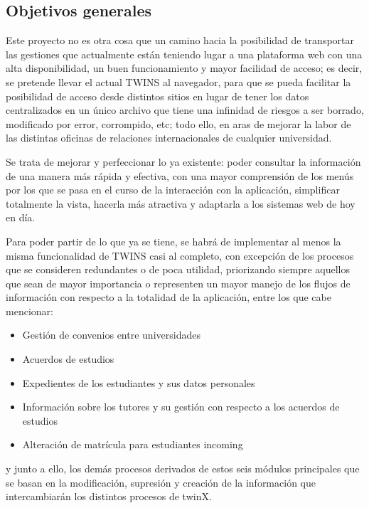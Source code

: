 \documentclass[12pt]{article}
\begin{document}
\subsection{Objetivos generales}

Este proyecto no es otra cosa que un camino hacia la posibilidad de transportar las gestiones que actualmente están teniendo lugar a una plataforma web con una alta disponibilidad, un buen funcionamiento y mayor facilidad de acceso; es decir, se pretende llevar el actual TWINS al navegador, para que se pueda facilitar la posibilidad de acceso desde distintos sitios en lugar de tener los datos centralizados en un único archivo que tiene una infinidad de riesgos a ser borrado, modificado por error, corrompido, etc; todo ello, en aras de mejorar la labor de las distintas oficinas de relaciones internacionales de cualquier universidad.

Se trata de mejorar y perfeccionar lo ya existente: poder consultar la información de una manera más rápida y efectiva, con una mayor comprensión de los menús por los que se pasa en el curso de la interacción con la aplicación, simplificar totalmente la vista, hacerla más atractiva y adaptarla a los sistemas web de hoy en día.

Para poder partir de lo que ya se tiene, se habrá de implementar al menos la misma funcionalidad de TWINS casi al completo, con excepción de los procesos que se consideren redundantes o de poca utilidad, priorizando siempre aquellos que sean de mayor importancia o representen un mayor manejo de los flujos de información con respecto a la totalidad de la aplicación, entre los que cabe mencionar:

\begin{itemize}
	\item Gestión de convenios entre universidades
	\item Acuerdos de estudios
	\item Expedientes de los estudiantes y sus datos personales
	\item Información sobre los tutores y su gestión con respecto a los acuerdos de estudios
	\item Alteración de matrícula para estudiantes incoming
\end{itemize}

y junto a ello, los demás procesos derivados de estos seis módulos principales que se basan en la modificación, supresión y creación de la información que intercambiarán los distintos procesos de twinX.
\end{document}

